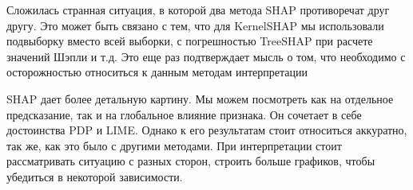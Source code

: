 Сложилась странная ситуация, в которой два метода SHAP противоречат друг другу. Это может быть связано с тем, что для KernelSHAP мы использовали подвыборку вместо всей выборки, с погрешностью TreeSHAP при расчете значений Шэпли и т.д. Это еще раз подтверждает мысль о том, что необходимо с осторожностью относиться к данным методам интерпретации

SHAP дает более детальную картину. Мы можем посмотреть как на отдельное предсказание, так и на глобальное влияние признака. Он сочетает в себе достоинства PDP и LIME. Однако к его результатам стоит относиться аккуратно, так же, как это было с другими методами. При интерпретации стоит рассматривать ситуацию с разных сторон, строить больше графиков, чтобы убедиться в некоторой зависимости.